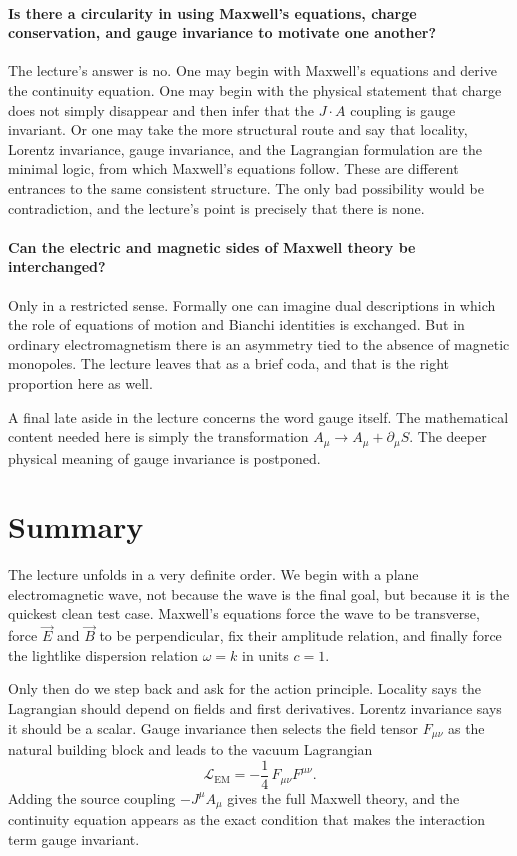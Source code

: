 \paragraph{Is there a circularity in using Maxwell's equations, charge conservation, and gauge invariance to motivate one another?}
The lecture's answer is no. One may begin with Maxwell's equations and derive the continuity equation. One may begin with the physical statement that charge does not simply disappear and then infer that the \(J\cdot A\) coupling is gauge invariant. Or one may take the more structural route and say that locality, Lorentz invariance, gauge invariance, and the Lagrangian formulation are the minimal logic, from which Maxwell's equations follow. These are different entrances to the same consistent structure. The only bad possibility would be contradiction, and the lecture's point is precisely that there is none.

\paragraph{Can the electric and magnetic sides of Maxwell theory be interchanged?}
Only in a restricted sense. Formally one can imagine dual descriptions in which the role of equations of motion and Bianchi identities is exchanged. But in ordinary electromagnetism there is an asymmetry tied to the absence of magnetic monopoles. The lecture leaves that as a brief coda, and that is the right proportion here as well.

A final late aside in the lecture concerns the word gauge itself. The mathematical content needed here is simply the transformation \(A_\mu\to A_\mu+\partial_\mu S\). The deeper physical meaning of gauge invariance is postponed.

\section{Summary}

The lecture unfolds in a very definite order. We begin with a plane electromagnetic wave, not because the wave is the final goal, but because it is the quickest clean test case. Maxwell's equations force the wave to be transverse, force \(\vec E\) and \(\vec B\) to be perpendicular, fix their amplitude relation, and finally force the lightlike dispersion relation \(\omega=k\) in units \(c=1\).

Only then do we step back and ask for the action principle. Locality says the Lagrangian should depend on fields and first derivatives. Lorentz invariance says it should be a scalar. Gauge invariance then selects the field tensor \(F_{\mu\nu}\) as the natural building block and leads to the vacuum Lagrangian
\begin{equation}
\mathcal L_{\mathrm{EM}}=-\frac14\,F_{\mu\nu}F^{\mu\nu}.
\end{equation}
Adding the source coupling \(-J^\mu A_\mu\) gives the full Maxwell theory, and the continuity equation appears as the exact condition that makes the interaction term gauge invariant.

